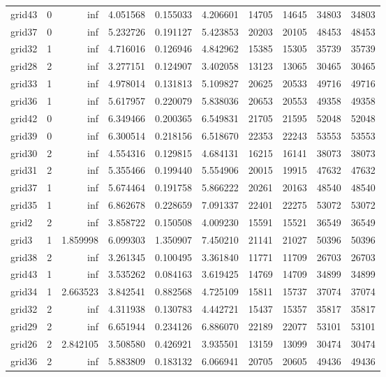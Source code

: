 \begin{longtable}{|l|r|r|r|r|r|r|r|r|r|}
grid43 & 0 & inf & 4.051568 & 0.155033 & 4.206601 & 14705 & 14645 & 34803 & 34803 \\
grid37 & 0 & inf & 5.232726 & 0.191127 & 5.423853 & 20203 & 20105 & 48453 & 48453 \\
grid32 & 1 & inf & 4.716016 & 0.126946 & 4.842962 & 15385 & 15305 & 35739 & 35739 \\
grid28 & 2 & inf & 3.277151 & 0.124907 & 3.402058 & 13123 & 13065 & 30465 & 30465 \\
grid33 & 1 & inf & 4.978014 & 0.131813 & 5.109827 & 20625 & 20533 & 49716 & 49716 \\
grid36 & 1 & inf & 5.617957 & 0.220079 & 5.838036 & 20653 & 20553 & 49358 & 49358 \\
grid42 & 0 & inf & 6.349466 & 0.200365 & 6.549831 & 21705 & 21595 & 52048 & 52048 \\
grid39 & 0 & inf & 6.300514 & 0.218156 & 6.518670 & 22353 & 22243 & 53553 & 53553 \\
grid30 & 2 & inf & 4.554316 & 0.129815 & 4.684131 & 16215 & 16141 & 38073 & 38073 \\
grid31 & 2 & inf & 5.355466 & 0.199440 & 5.554906 & 20015 & 19915 & 47632 & 47632 \\
grid37 & 1 & inf & 5.674464 & 0.191758 & 5.866222 & 20261 & 20163 & 48540 & 48540 \\
grid35 & 1 & inf & 6.862678 & 0.228659 & 7.091337 & 22401 & 22275 & 53072 & 53072 \\
grid2 & 2 & inf & 3.858722 & 0.150508 & 4.009230 & 15591 & 15521 & 36549 & 36549 \\
grid3 & 1 & 1.859998 & 6.099303 & 1.350907 & 7.450210 & 21141 & 21027 & 50396 & 50396 \\
grid38 & 2 & inf & 3.261345 & 0.100495 & 3.361840 & 11771 & 11709 & 26703 & 26703 \\
grid43 & 1 & inf & 3.535262 & 0.084163 & 3.619425 & 14769 & 14709 & 34899 & 34899 \\
grid34 & 1 & 2.663523 & 3.842541 & 0.882568 & 4.725109 & 15811 & 15737 & 37074 & 37074 \\
grid32 & 2 & inf & 4.311938 & 0.130783 & 4.442721 & 15437 & 15357 & 35817 & 35817 \\
grid29 & 2 & inf & 6.651944 & 0.234126 & 6.886070 & 22189 & 22077 & 53101 & 53101 \\
grid26 & 2 & 2.842105 & 3.508580 & 0.426921 & 3.935501 & 13159 & 13099 & 30474 & 30474 \\
grid36 & 2 & inf & 5.883809 & 0.183132 & 6.066941 & 20705 & 20605 & 49436 & 49436 \\

\end{longtable}
